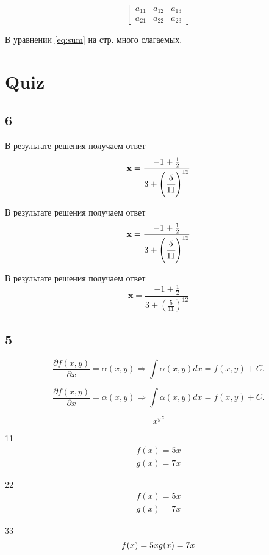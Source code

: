 \documentclass[a4paper,12pt]{article} %
\begin{document}
\[
	\begin{bmatrix}
		a_{11} & a_{12} & a_{13} \\
		a_{21} & a_{22} & a_{23}
	\end{bmatrix}
\]

В уравнении \eqref{eq:sum} на стр. \pageref{eq:sum} много слагаемых.



\section{Quiz}

\subsection{6}

В результате решения получаем ответ
\[\mathbf x=\frac{-1+\frac12}
{3+\left(\cfrac{5}{11}\right)^{12}}\]

В результате решения получаем ответ
\[\mathbf{x}=\frac{-1+\frac{1}{2}}
{3+\left(\cfrac{5}{11}\right)^{12}}\]

В результате решения получаем ответ
\[\mathbf x=\frac{-1+\frac12}
{3+\left(\frac{5}{11}\right)^{12}}\]

\subsection{5}

\[
\frac{\partial f(x,y)}{\partial x}=\alpha(x,y)
\Rightarrow\int\alpha(x,y)dx=f(x,y)+C.
\]

\[\frac{\partial f(x,y)}{\partial x}=\alpha(x,y)
\Rightarrow\int\alpha(x,y)dx=f(x,y)+C.\]


\[{x^y}^z\]


11
\begin{align}
f(x)=5x\\
g(x)=7x
\end{align} 

22
\begin{equation}
\begin{aligned}
f(x)=5x\\
g(x)=7x
\end{aligned}
\end{equation}

33
\begin{equation}
f(x)=5x\\
g(x)=7x
\end{equation}
\end{document}
